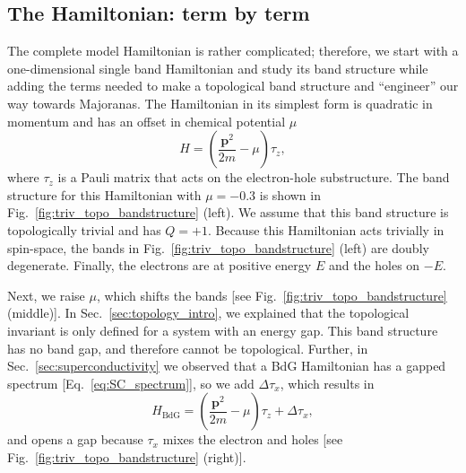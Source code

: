 \subsection{The Hamiltonian: term by term}\label{sec:hamiltonian_term_by_term}
The complete model Hamiltonian is rather complicated; therefore, we start with a one-dimensional single band Hamiltonian and study its band structure while adding the terms needed to make a topological band structure and ``engineer'' our way towards Majoranas.
The Hamiltonian in its simplest form is quadratic in momentum and has an offset in chemical potential $\mu$
\begin{equation}
H=\left(\frac{\bm{p}^{2}}{2m}-\mu\right)\tau_{z},\label{eq:simple_ham}
\end{equation}
where $\tau_{z}$ is a Pauli matrix that acts on the electron-hole substructure.
The band structure for this Hamiltonian with $\mu=-0.3$ is shown in Fig.~\ref{fig:triv_topo_bandstructure} (left).
We assume that this band structure is topologically trivial and has $Q=+1$.
Because this Hamiltonian acts trivially in spin-space, the bands in Fig.~\ref{fig:triv_topo_bandstructure} (left) are doubly degenerate.
Finally, the electrons are at positive energy $E$ and the holes on $-E$.

Next, we raise $\mu$, which shifts the bands [see Fig.~\ref{fig:triv_topo_bandstructure} (middle)].
In Sec.~\ref{sec:topology_intro}, we explained that the topological invariant is only defined for a system with an energy gap.
This band structure has no band gap, and therefore cannot be topological.
Further, in Sec.~\ref{sec:superconductivity} we observed that a BdG Hamiltonian has a gapped spectrum [Eq.~\eqref{eq:SC_spectrum}], so we add $\Delta\tau_{x}$, which results in
\begin{equation}
H_{\textrm{BdG}}=\left(\frac{\bm{p}^{2}}{2m}-\mu\right)\tau_{z}+\Delta\tau_{x},
\end{equation}
and opens a gap because $\tau_{x}$ mixes the electron and holes [see Fig.~\ref{fig:triv_topo_bandstructure} (right)].

